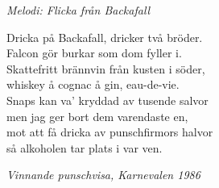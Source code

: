{\footnotesize\textit{Melodi: Flicka från Backafall}}\par
\vspace{10pt}
Dricka på Backafall, dricker två bröder.\\
Falcon gör burkar som dom fyller i.\\
Skattefritt brännvin från kusten i söder,\\
whiskey å cognac å gin, eau-de-vie.\\
Snaps kan va’ kryddad av tusende salvor\\
men jag ger bort dem varendaste en,\\
mot att få dricka av punschfirmors halvor\\
så alkoholen tar plats i var ven.\par
\vspace{10pt}
{\footnotesize\textit{Vinnande punschvisa, Karnevalen 1986}}
